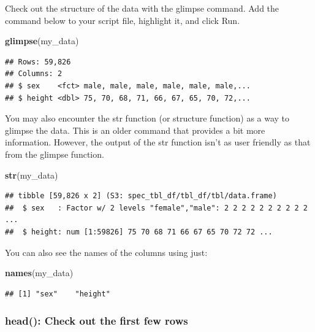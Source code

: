 \documentclass[
]{krantz}
\makeatletter
\newenvironment{Shaded}{\begin{snugshade}}{\end{snugshade}}
\newcommand{\KeywordTok}[1]{\textcolor[rgb]{0.27,0.27,0.27}{\textbf{#1}}}
\newcommand{\NormalTok}[1]{#1}
\newenvironment{kframe}{%
\medskip{}
\setlength{\fboxsep}{.8em}
 \def\at@end@of@kframe{}%
 \ifinner\ifhmode%
  \def\at@end@of@kframe{\end{minipage}}%
  \begin{minipage}{\columnwidth}%
 \fi\fi%
 \def\FrameCommand##1{\hskip\@totalleftmargin \hskip-\fboxsep
 \colorbox{shadecolor}{##1}\hskip-\fboxsep
     \hskip-\linewidth \hskip-\@totalleftmargin \hskip\columnwidth}%
 \MakeFramed {\advance\hsize-\width
   \@totalleftmargin\z@ \linewidth\hsize
   \@setminipage}}%
 {\par\unskip\endMakeFramed%
 \at@end@of@kframe}
\renewenvironment{Shaded}{\begin{kframe}}{\end{kframe}}
\makeatother
\begin{document}
Check out the structure of the data with the glimpse command. Add the command below to your script file, highlight it, and click Run.

\begin{Shaded}
\begin{Highlighting}[]
\KeywordTok{glimpse}\NormalTok{(my_data)}
\end{Highlighting}
\end{Shaded}

\begin{verbatim}
## Rows: 59,826
## Columns: 2
## $ sex    <fct> male, male, male, male, male, male,...
## $ height <dbl> 75, 70, 68, 71, 66, 67, 65, 70, 72,...
\end{verbatim}

You may also encounter the str function (or structure function) as a way to glimpse the data. This is an older command that provides a bit more information. However, the output of the str function isn't as user friendly as that from the glimpse function.

\begin{Shaded}
\begin{Highlighting}[]
\KeywordTok{str}\NormalTok{(my_data)}
\end{Highlighting}
\end{Shaded}

\begin{verbatim}
## tibble [59,826 x 2] (S3: spec_tbl_df/tbl_df/tbl/data.frame)
##  $ sex   : Factor w/ 2 levels "female","male": 2 2 2 2 2 2 2 2 2 2 ...
##  $ height: num [1:59826] 75 70 68 71 66 67 65 70 72 72 ...
\end{verbatim}

You can also see the names of the columns using just:

\begin{Shaded}
\begin{Highlighting}[]
\KeywordTok{names}\NormalTok{(my_data)}
\end{Highlighting}
\end{Shaded}

\begin{verbatim}
## [1] "sex"    "height"
\end{verbatim}

\hypertarget{head-check-out-the-first-few-rows}{%
\subsubsection{head(): Check out the first few rows}\label{head-check-out-the-first-few-rows}}
\end{document}
